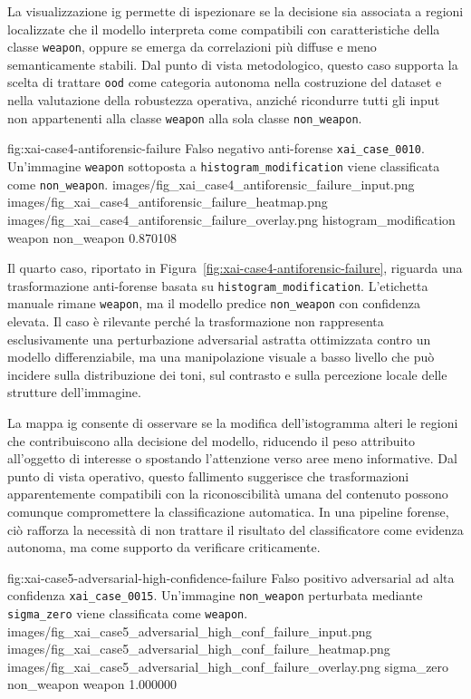 La visualizzazione \gls{ig} permette di ispezionare se la decisione sia
associata a regioni localizzate che il modello interpreta come compatibili con
caratteristiche della classe \texttt{weapon}, oppure se emerga da correlazioni
più diffuse e meno semanticamente stabili. Dal punto di vista metodologico,
questo caso supporta la scelta di trattare \texttt{ood} come categoria autonoma
nella costruzione del dataset e nella valutazione della robustezza operativa,
anziché ricondurre tutti gli input non appartenenti alla classe \texttt{weapon}
alla sola classe \texttt{non\_weapon}.

\XAIcaseFigure
{fig:xai-case4-antiforensic-failure}
{Falso negativo anti-forense \texttt{xai\_case\_0010}. Un'immagine \texttt{weapon} sottoposta a \texttt{histogram\_modification} viene classificata come \texttt{non\_weapon}.}
{images/fig_xai_case4_antiforensic_failure_input.png}
{images/fig_xai_case4_antiforensic_failure_heatmap.png}
{images/fig_xai_case4_antiforensic_failure_overlay.png}
{histogram\_modification}
{weapon}
{non\_weapon}
{0.870108}

Il quarto caso, riportato in Figura~\ref{fig:xai-case4-antiforensic-failure},
riguarda una trasformazione anti-forense basata su
\texttt{histogram\_modification}. L'etichetta manuale rimane \texttt{weapon},
ma il modello predice \texttt{non\_weapon} con confidenza elevata. Il caso è
rilevante perché la trasformazione non rappresenta esclusivamente una
perturbazione adversarial astratta ottimizzata contro un modello differenziabile,
ma una manipolazione visuale a basso livello che può incidere sulla
distribuzione dei toni, sul contrasto e sulla percezione locale delle strutture
dell'immagine.

La mappa \gls{ig} consente di osservare se la modifica dell'istogramma alteri
le regioni che contribuiscono alla decisione del modello, riducendo il peso
attribuito all'oggetto di interesse o spostando l'attenzione verso aree meno
informative. Dal punto di vista operativo, questo fallimento suggerisce che
trasformazioni apparentemente compatibili con la riconoscibilità umana del
contenuto possono comunque compromettere la classificazione automatica. In una
pipeline forense, ciò rafforza la necessità di non trattare il risultato del
classificatore come evidenza autonoma, ma come supporto da verificare
criticamente.

\XAIcaseFigure
{fig:xai-case5-adversarial-high-confidence-failure}
{Falso positivo adversarial ad alta confidenza \texttt{xai\_case\_0015}. Un'immagine \texttt{non\_weapon} perturbata mediante \texttt{sigma\_zero} viene classificata come \texttt{weapon}.}
{images/fig_xai_case5_adversarial_high_conf_failure_input.png}
{images/fig_xai_case5_adversarial_high_conf_failure_heatmap.png}
{images/fig_xai_case5_adversarial_high_conf_failure_overlay.png}
{sigma\_zero}
{non\_weapon}
{weapon}
{1.000000}

